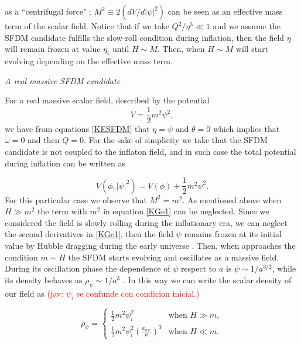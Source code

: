 \documentclass[amssymb,twocolumn,prd,nofootinbib,showpacs]{revtex4-1}
\newcommand{\jav}[1]{\textcolor{red}{(jav: #1)}}
\begin{document}
as a ``centrifugal force" \cite{charge4}; $M^2\equiv 2(dV/d|\psi|^2)$ can be seen as an effective mass term 
of the scalar field. Notice that if we take $Q^2/\eta^3\ll 1$ and we assume the SFDM candidate fulfills 
the slow-roll condition during inflation, then the field $\eta$ will remain frozen at value $\eta_i$ until $H\sim M$. 
Then, when $H\sim M$ will start evolving depending on the effective mass term.
\begin{center}
\textit{A real massive SFDM candidate}
\end{center}

For a real massive scalar field, described by the potential 
\begin{equation}
V = \frac{1}{2}m^2\psi^2,
\end{equation}
%
we have from equations \eqref{KESFDM} that $\eta=\psi$ and $\theta=0$ which implies that $\omega=0$ and then $Q = 0$. 
For the sake of simplicity we take that the SFDM candidate is not coupled to the inflaton field, and in such case 
the total potential during inflation can be written as 

\begin{equation}\label{potential_massive}
V(\phi,|\psi|^2)=V(\phi)+\frac{1}{2}m^2\psi^2.
\end{equation}
%
For this particular case we observe that  $M^2=m^2$. As mentioned above when $H\gg m^2$ the term with $m^2$ 
in equation \eqref{KGe1} can be neglected. Since we considered the field is slowly rolling during the inflationary era, 
we can neglect the second derivatives in \eqref{KGe1}, then the field $\psi$ remains frozen at its initial value by 
Hubble dragging during the early universe \cite{curvatonatractor}. 
%
Then, when approaches the condition $m\sim H$ the SFDM starts evolving and oscillates as a massive field. 
During its oscillation phase the dependence of $\psi$ respect to $a$ is $\psi\sim 1/a^{3/2}$, while its density 
behaves as $\rho_{\psi}\sim 1/a^3$  \cite{SFphi41,SFphi42}. In this way we can write the scalar density 
of our field as \jav{$\psi_i$ se confunde con condicion inicial.}

\begin{equation}\label{rhosfdm}
\rho_\psi = \left\lbrace\begin{array}{ll}
\frac{1}{2}m^2\psi_i^2 & \text{when }H\gg m, \\
\frac{1}{2}m^2\psi_i^2\left(\frac{a_{osc}}{a}\right)^3 & \text{when }H\ll m.
\end{array}\right .
\end{equation}
\end{document}
